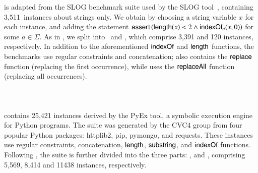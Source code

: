  is adapted from the SLOG benchmark suite used by the SLOG tool~\cite{fang-yu-circuits}, containing 3,511~instances about strings only.
We  obtain  {\slogbench}  by choosing a string variable $x$ for each instance,
and adding the statement $\textsf{assert}\left(\mathsf{length}(x) < 2 \wedge \mathsf{indexOf}_{a}(x, 0)\right)$ for some $a \in \Sigma$.
As in \cite{CHL+19}, we  split  {\slogbench}  into  \slogbenchr\ and \slogbenchra, which comprise 3,391 and 120 instances, respectively. In addition to the aforementioned $\mathsf{indexOf}$ and $\mathsf{length}$ functions, the benchmarks use regular constraints and concatenation;  {\slogbenchr} also contains the $\mathsf{replace}$ function (replacing the first occurrence), while {\slogbenchra}  uses the $\mathsf{replaceAll}$ function (replacing all occurrences).


\paragraph*{\pyexbench~\cite{ReynoldsWBBLT17}}

contains 25,421 instances  derived by the PyEx tool, a symbolic execution engine for Python programs. The {\pyexbench} suite was generated by the CVC4 group from four popular Python packages: httplib2, pip, pymongo, and requests. These instances use regular constraints, concatenation, $\mathsf{length}$, $\mathsf{substring}$, and $\mathsf{indexOf}$ functions. Following \cite{ReynoldsWBBLT17}, the {\pyexbench} suite is further divided into the three parts: {\pyextdbench},  {\pyexztbench} and {\pyexzzbench}, comprising 5,569, 8,414 and 11438  instances, respectively. 

\paragraph*{\kaluzabench~\cite{Berkeley-JavaScript}}


